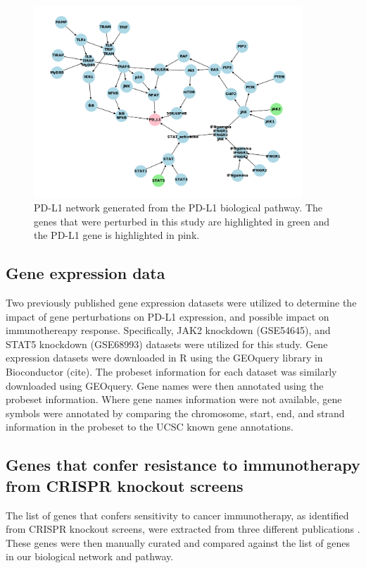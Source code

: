 \documentclass{article}
\begin{document}
\begin{figure}
    \includegraphics[width = 0.9\textwidth]{Images/PD-L1_pathway_graphViz.png}
    \caption{PD-L1 network generated from the PD-L1 biological pathway. The genes that were perturbed in this study are highlighted in green and the PD-L1 gene is highlighted in pink.}
    \label{fig:PDL1_network}
\end{figure}

\subsection{Gene expression data}
Two previously published gene expression datasets were utilized to determine the impact of gene perturbations on PD-L1 expression, and possible impact on immunothereapy response. Specifically, JAK2 knockdown (GSE54645), and STAT5 knockdown (GSE68993) datasets were utilized for this study. Gene expression datasets were downloaded in R using the GEOquery library in Bioconductor (cite). The probeset information for each dataset was similarly downloaded using GEOquery. Gene names were then annotated using the probeset information. Where gene names information were not available, gene symbols were annotated by comparing the chromosome, start, end, and strand information in the probeset to the UCSC known gene annotations.


\subsection{Genes that confer resistance to immunotherapy from CRISPR knockout screens}

The list of genes that confers sensitivity to cancer immunotherapy, as identified from CRISPR knockout screens, were extracted from three different publications \cite{patel2017identification, manguso2017vivo, pan2018major}. These genes were then manually curated and compared against the list of genes in our biological network and pathway.
\end{document}
